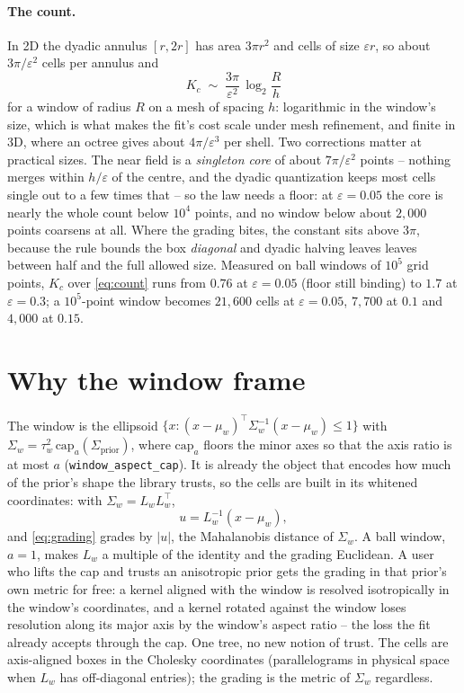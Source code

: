 \documentclass[11pt]{article}
\newcommand{\eps}{\varepsilon}
\newcommand{\code}[1]{\texttt{#1}}
\begin{document}
\paragraph{The count.} In 2D the dyadic annulus $[r, 2r]$ has area $3\pi
r^2$ and cells of size $\eps r$, so about $3\pi/\eps^2$ cells per annulus and
\begin{equation}
K_c \;\sim\; \frac{3\pi}{\eps^2}\,\log_2\frac{R}{h}
\label{eq:count}
\end{equation}
for a window of radius $R$ on a mesh of spacing $h$: logarithmic in the
window's size, which is what makes the fit's cost scale under mesh
refinement, and finite in 3D, where an octree gives about $4\pi/\eps^3$ per
shell. Two corrections matter at practical sizes. The near field is a
\emph{singleton core} of about $7\pi/\eps^2$ points -- nothing merges within
$h/\eps$ of the centre, and the dyadic quantization keeps most cells single
out to a few times that -- so the law needs a floor: at $\eps = 0.05$ the
core is nearly the whole count below $10^4$ points, and no window below about
$2{,}000$ points coarsens at all. Where the grading bites, the constant sits
above $3\pi$, because the rule bounds the box \emph{diagonal} and dyadic
halving leaves leaves between half and the full allowed size. Measured on
ball windows of $10^5$ grid points, $K_c$ over \eqref{eq:count} runs from
$0.76$ at $\eps = 0.05$ (floor still binding) to $1.7$ at $\eps = 0.3$; a
$10^5$-point window becomes $21{,}600$ cells at $\eps = 0.05$, $7{,}700$ at
$0.1$ and $4{,}000$ at $0.15$.

\section{Why the window frame}
\label{sec:frame}

The window is the ellipsoid $\{x : (x - \mu_w)^\top \Sigma_w^{-1} (x - \mu_w)
\le 1\}$ with $\Sigma_w = \tau_w^2\, \mathrm{cap}_a(\Sigma_{\mathrm{prior}})$,
where $\mathrm{cap}_a$ floors the minor axes so that the axis ratio is at
most $a$ (\code{window\_aspect\_cap}). It is already the object that encodes
how much of the prior's shape the library trusts, so the cells are built in
its whitened coordinates: with $\Sigma_w = L_w L_w^\top$,
\begin{equation}
u = L_w^{-1}(x - \mu_w),
\label{eq:frame}
\end{equation}
and \eqref{eq:grading} grades by $|u|$, the Mahalanobis distance of
$\Sigma_w$. A ball window, $a = 1$, makes $L_w$ a multiple of the identity
and the grading Euclidean. A user who lifts the cap and trusts an anisotropic
prior gets the grading in that prior's own metric for free: a kernel aligned
with the window is resolved isotropically in the window's coordinates, and a
kernel rotated against the window loses resolution along its major axis by
the window's aspect ratio -- the loss the fit already accepts through the
cap. One tree, no new notion of trust. The cells are axis-aligned boxes in
the Cholesky coordinates (parallelograms in physical space when $L_w$ has
off-diagonal entries); the grading is the metric of $\Sigma_w$ regardless.
\end{document}
